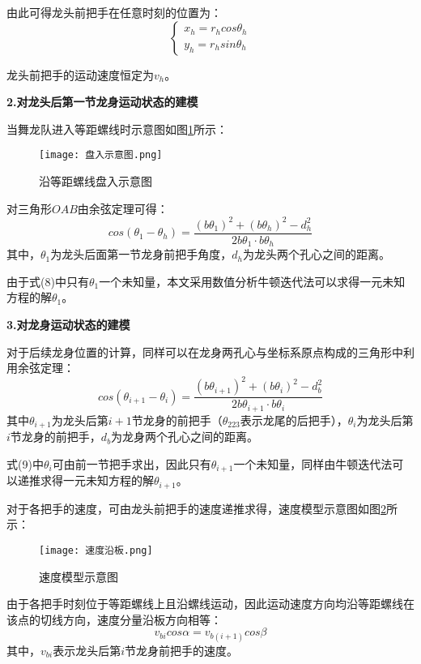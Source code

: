 \documentclass[withoutpreface,bwprint]{cumcmthesis} %
\begin{document}
	由此可得龙头前把手在任意时刻的位置为：
	\begin{equation}
		\begin{cases}
			x_h=r_hcos\theta_h\\
			y_h=r_hsin\theta_h
		\end{cases}
	\end{equation}
	
	龙头前把手的运动速度恒定为$v_h$。
	
	\textbf{2.对龙头后第一节龙身运动状态的建模}
	
	当舞龙队进入等距螺线时示意图如图\ref{盘入}所示：
	\begin{figure}[H]
		\centering
		\texttt{[image: 盘入示意图.png]}
		\caption{沿等距螺线盘入示意图}
		\label{盘入} %
	\end{figure}
	对三角形$OAB$由余弦定理\cite{2}可得：
	\begin{equation}
		cos(\theta_1-\theta_h)=\dfrac{(b\theta_1)^2+(b\theta_h)^2-d^2_h}{2b\theta_1\cdot b\theta_h}
	\end{equation}
	其中，$\theta_1$为龙头后面第一节龙身前把手角度，$d_h$为龙头两个孔心之间的距离。
	
	由于式(8)中只有$\theta_1$一个未知量，本文采用数值分析牛顿迭代法可以求得一元未知方程的解$\theta_1$。
	
	\textbf{3.对龙身运动状态的建模}
	
	对于后续龙身位置的计算，同样可以在龙身两孔心与坐标系原点构成的三角形中利用余弦定理：
	\begin{equation}
		cos(\theta_{i+1}-\theta_i)=\dfrac{(b\theta_{i+1})^2+(b\theta_i)^2-d^2_b}{2b\theta_{i+1}\cdot b\theta_i}
	\end{equation}
	其中$\theta_{i+1}$为龙头后第$i+1$节龙身的前把手（$\theta_{223}$表示龙尾的后把手），$\theta_i$为龙头后第$i$节龙身的前把手，$d_b$为龙身两个孔心之间的距离。
	
	式(9)中$\theta_i$可由前一节把手求出，因此只有$\theta_{i+1}$一个未知量，同样由牛顿迭代法可以递推求得一元未知方程的解$\theta_{i+1}$。
	
	对于各把手的速度，可由龙头前把手的速度递推求得，速度模型示意图如图\ref{速度}所示：
	\begin{figure}[H]
		\centering
		\texttt{[image: 速度沿板.png]}
		\caption{速度模型示意图}
		\label{速度} %
	\end{figure}
	由于各把手时刻位于等距螺线上且沿螺线运动，因此运动速度方向均沿等距螺线在该点的切线方向，速度分量沿板方向相等：
	\begin{equation}
		v_{bi}cos\alpha=v_{b(i+1)}cos\beta
	\end{equation}
	其中，$v_{bi}$表示龙头后第$i$节龙身前把手的速度。
	
\end{document}
